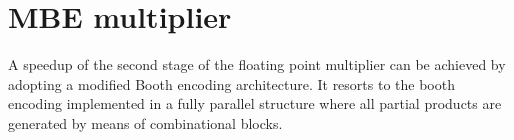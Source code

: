 \chapter{MBE multiplier}
A speedup of the second stage of the floating point multiplier can be achieved by adopting a modified Booth encoding architecture. It resorts to the booth encoding implemented in a fully parallel structure where all partial products are generated by means of combinational blocks.



